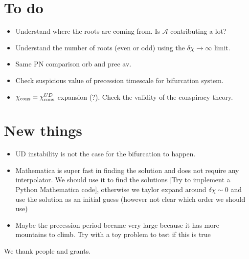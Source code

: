 \documentclass[floats,floatfix,showpacs,amssymb,prd,twocolumn,superscriptaddress,nofootinbib,nolongbibliography,reprint,onecolumn]{revtex4-2}
\newcommand{\deltachi}{\delta \chi}
\newcommand{\chicons}{\chi_{\rm cons}}
\begin{document}
 
 \section{To do}
 
\begin{itemize}
 \item Understand where the roots are coming from. Is $\mathcal{A}$ contributing a lot?
  \item Understand the number of roots (even or odd) using the $\deltachi \to \infty$ limit.
   \item Same PN comparison orb and prec av.
    \item Check suspicious value of precession timescale for bifurcation system.
 \item $\chicons=\chicons^{UD}$ expansion (?). Check the validity of the conspiracy theory.
\end{itemize}


\section{New things}
\begin{itemize}
 \item UD instability is not the case for the bifurcation to happen.
 \item Mathematica is super fast in finding the solution and does not require any interpolator. We should use it to find the solutions [Try to implement a Python Mathematica code], otherwise we taylor expand around $\deltachi \sim 0$ and use the solution as an initial guess (however not clear which order we should use)
 \item Maybe the precession period became very large because it has more mountains to climb. Try with a toy problem to test if this is true
  
  
  
  \end{itemize}

\acknowledgements

We thank people and grants.


\end{document}

